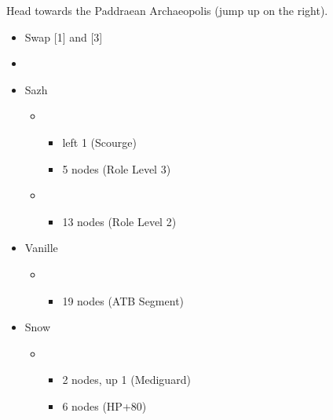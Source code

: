 Head towards the Paddraean Archaeopolis (jump up on the right).

\begin{menu}
	\begin{itemize}
		\paradigm
		\begin{itemize}
			\item Swap [1] and [3]
			\item {}%
				  {\paradigmline[4]{\syn}{(\med)}{\com}}%
			      {\paradigmline{(\rav)}{\rav}{(\rav)}}%
			      {\paradigmline{(\rav)}{\med}{(\rav)}}%
			      {\paradigmline{(\rav)}{\sab}{(\rav)}}%
			      {\paradigmline{\com}{(\rav)}{\com}}%
			      {\paradigmline{(\rav)}{(\rav)}{\sen}}
		\end{itemize}
		\crystarium
		\begin{itemize}
			\item Sazh
				\begin{itemize}
					\item \com
						\begin{itemize}
							\item left 1 (Scourge)
							\item 5 nodes (Role Level 3)
						\end{itemize}
					\item \rav
						\begin{itemize}
							\item 13 nodes (Role Level 2)
						\end{itemize}
				\end{itemize}
			\item Vanille
				\begin{itemize}
					\item \med
						\begin{itemize}
							\item 19 nodes (ATB Segment)
						\end{itemize}
				\end{itemize}
			\item Snow
				\begin{itemize}
					\item \sen
						\begin{itemize}
							\item 2 nodes, up 1 (Mediguard)
							\item 6 nodes (HP+80)
						\end{itemize}
				\end{itemize}
		\end{itemize}

\end{itemize}
\end{menu}
